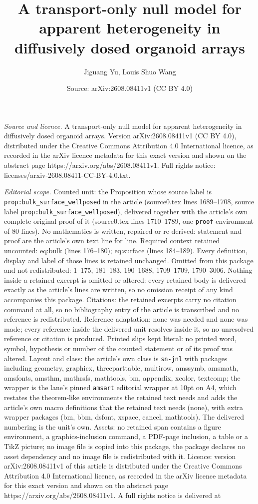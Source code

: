\documentclass[10pt,a4paper]{amsart}
\title[A transport-only null model for apparent heterogeneity in di]{A transport-only null model for apparent heterogeneity in diffusively dosed organoid arrays}
\author{Jiguang Yu, Louis Shuo Wang}
\date{Source: arXiv:2608.08411v1 (CC BY 4.0)}
\begin{document}
\maketitle

\noindent\emph{Source and licence.} A transport-only null model for apparent heterogeneity in diffusively dosed organoid arrays. Version arXiv:2608.08411v1 (CC BY 4.0), distributed under the Creative Commons Attribution 4.0 International licence, as recorded in the arXiv licence metadata for this exact version and shown on the abstract page https://arxiv.org/abs/2608.08411v1. Full rights notice: licenses/arxiv-2608.08411-CC-BY-4.0.txt.\par\smallskip

\noindent\textit{Editorial scope.} Counted unit: the Proposition whose source label is \texttt{prop:bulk\_surface\_wellposed} in the article (source0.tex lines 1689--1708, source label \texttt{prop:bulk\_surface\_wellposed}), delivered together with the article's own complete original proof of it (source0.tex lines 1710--1789, one \texttt{proof} environment of 80 lines). No mathematics is written, repaired or re-derived: statement and proof are the article's own text line for line. Required context retained uncounted: eq:bulk (lines 176--180); eq:surface (lines 184--189). Every definition, display and label of those lines is retained unchanged. Omitted from this package and not redistributed: 1--175, 181--183, 190--1688, 1709--1709, 1790--3006. Nothing inside a retained excerpt is omitted or altered: every retained body is delivered exactly as the article's lines are written, so no omission receipt of any kind accompanies this package. Citations: the retained excerpts carry no citation command at all, so no bibliography entry of the article is transcribed and no reference is redistributed. Reference adaptation: none was needed and none was made; every reference inside the delivered unit resolves inside it, so no unresolved reference or citation is produced. Printed slips kept literal: no printed word, symbol, hypothesis or number of the counted statement or of its proof was altered. Layout and class: the article's own class is \texttt{sn-jnl} with packages including geometry, graphicx, threeparttable, multirow, amssymb, amsmath, amsfonts, amsthm, mathrsfs, mathtools, bm, appendix, xcolor, textcomp; the wrapper is the lane's pinned \texttt{amsart} editorial wrapper at 10pt on A4, which restates the theorem-like environments the retained text needs and adds the article's own macro definitions that the retained text needs (none), with extra wrapper packages (bm, bbm, dsfont, xspace, cancel, mathtools). The delivered numbering is the unit's own. Assets: no retained span contains a figure environment, a graphics-inclusion command, a PDF-page inclusion, a table or a TikZ picture; no image file is copied into this package, the package declares no asset dependency and no image file is redistributed with it. Licence: version arXiv:2608.08411v1 of this article is distributed under the Creative Commons Attribution 4.0 International licence, as recorded in the arXiv licence metadata for this exact version and shown on the abstract page https://arxiv.org/abs/2608.08411v1. A full rights notice is delivered at 
\end{document}
